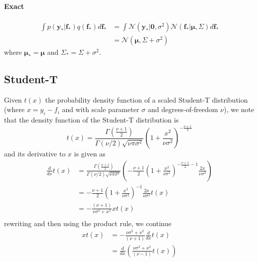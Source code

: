 \documentclass[5p,11pt]{article}
\begin{document}
\paragraph{Exact}
\begin{equation}
    \begin{aligned}
        \int p(\bm{y}_*|\bm{f}_*) q(\bm{f}_*) d\bm{f}_* &= \int \mathcal{N}(\bm{y}_*|\bm{0},\sigma^2) \mathcal{N}(\bm{f}_*|\bm{\mu},\Sigma) d\bm{f}_*\\
        &= \mathcal{N}(\bm{\mu}, \Sigma + \sigma^2)
    \end{aligned}
\end{equation}
where $\bm{\mu}_* = \bm{\mu}$ and $\Sigma_* = \Sigma + \sigma^2$.

\subsection{Student-T}
Given $t(x)$ the probability density function of a scaled Student-T distribution (where $x = y_i-f_i$ and with scale parameter $\sigma$ and degrees-of-freedom $\nu$), we note that the density function of the Student-T distribution is
$$ t(x) = \frac{\Gamma\left(\frac{\nu+1}{2}\right)}{\Gamma(\nu/2)\sqrt{\nu\pi\sigma^2}}\left(1+\frac{x^2}{\nu\sigma^2}\right)^{-\frac{\nu+1}{2}}$$
and its derivative to $x$ is given as
\begin{equation}
    \begin{aligned}
        \frac{d}{dx}t(x) &= \frac{\Gamma\left(\frac{\nu+1}{2}\right)}{\Gamma(\nu/2)\sqrt{\nu\pi\sigma^2}}\left(-\frac{\nu+1}{2}\left(1+\frac{x^2}{\nu\sigma^2}\right)^{-\frac{\nu+1}{2}-1}\frac{2x}{\nu\sigma^2}\right)\\
        &= -\frac{\nu+1}{2}\left(1+\frac{x^2}{\nu\sigma^2}\right)^{-1}\frac{2x}{\nu\sigma^2} t(x)\\
        &= -\frac{(\nu+1)}{\nu\sigma^2+x^2}xt(x)\\
     \end{aligned}
\end{equation}
rewriting and then using the product rule, we continue
\begin{equation}
    \begin{aligned}
        xt(x) &= -\frac{\nu\sigma^2+x^2}{(\nu+1)} \frac{d}{dx}t(x)\\
        &= \frac{d}{dx} \left(\frac{\nu\sigma^2+x^2}{(\nu-1)} t(x)\right)
     \end{aligned}
\end{equation}
\end{document}
